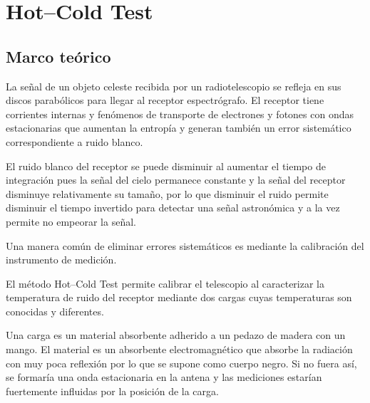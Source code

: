 \section{Hot--Cold Test}\label{sec:hotcoldtest}

\subsection{Marco teórico}

La señal de un objeto celeste recibida por un radiotelescopio se refleja en sus discos parabólicos para llegar al receptor espectrógrafo. El receptor tiene corrientes internas y fenómenos de transporte de electrones y fotones con ondas estacionarias que aumentan la entropía y generan también un error sistemático correspondiente a ruido blanco.

El ruido blanco del receptor se puede disminuir al aumentar el tiempo de integración pues la señal del cielo permanece constante y la señal del receptor disminuye relativamente su tamaño, por lo que disminuir el ruido permite disminuir el tiempo invertido para detectar una señal astronómica y a la vez permite no empeorar la señal.

Una manera común de eliminar errores sistemáticos es mediante la calibración del instrumento de medición.

El método Hot--Cold Test permite calibrar el telescopio al caracterizar la temperatura de ruido del receptor mediante dos cargas cuyas temperaturas son conocidas y diferentes.

Una carga es un material absorbente adherido a un pedazo de madera con un mango. El material es un absorbente electromagnético que absorbe la radiación con muy poca reflexión por lo que se supone como cuerpo negro. Si no fuera así, se formaría una onda estacionaria en la antena y las mediciones estarían fuertemente influidas por la posición de la carga.

